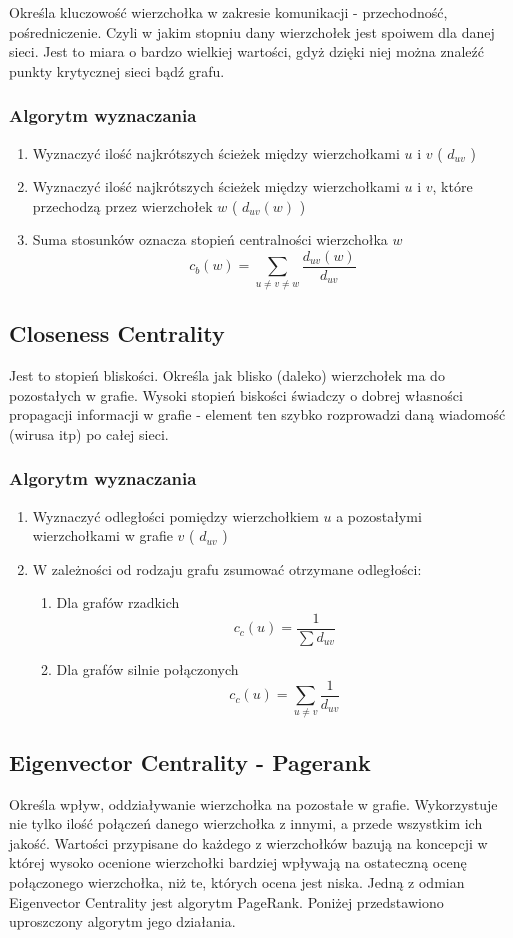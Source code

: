 Określa kluczowość wierzchołka w zakresie komunikacji - przechodność, pośredniczenie. Czyli w jakim stopniu dany wierzchołek jest spoiwem dla danej sieci. Jest to miara o bardzo wielkiej wartości, gdyż dzięki niej można znaleźć punkty krytycznej sieci bądź grafu.

\subsubsection{Algorytm wyznaczania}
\begin{enumerate}
\item Wyznaczyć ilość najkrótszych ścieżek między wierzchołkami $u$ i $v$ ( $d_{uv}$ )
\item Wyznaczyć ilość najkrótszych ścieżek między wierzchołkami $u$ i $v$, które przechodzą przez wierzchołek $w$ ( $d_{uv}(w)$ )
\item Suma stosunków  oznacza stopień centralności wierzchołka $w$ $$c_b(w) = \sum_{u \neq v \neq w} \frac{d_{uv}(w)}{d_{uv}}$$
\end{enumerate}

\subsection{Closeness Centrality}

Jest to stopień bliskości. Określa jak blisko (daleko) wierzchołek ma do pozostałych w grafie. Wysoki stopień biskości świadczy o dobrej własności propagacji informacji w grafie - element ten szybko rozprowadzi daną wiadomość (wirusa itp) po całej sieci.


\subsubsection{Algorytm wyznaczania}
\begin{enumerate}
\item Wyznaczyć odległości pomiędzy wierzchołkiem $u$ a pozostałymi wierzchołkami w grafie $v$  ( $d_{uv}$ )
\item W zależności od rodzaju grafu zsumować otrzymane odległości:
\begin{enumerate}
\item Dla grafów rzadkich $$ c_c(u) = \frac{1}{\sum d_{uv} }$$
\item Dla grafów silnie połączonych $$ c_c(u) = \sum_{u \neq v} \frac{1}{d_{uv} }$$
\end{enumerate}
\end{enumerate}
\newpage
\subsection{Eigenvector Centrality - Pagerank}
Określa wpływ, oddziaływanie wierzchołka na pozostałe w grafie. Wykorzystuje nie tylko ilość połączeń danego wierzchołka z innymi, a przede wszystkim ich jakość. Wartości przypisane do każdego z wierzchołków bazują na koncepcji w której wysoko ocenione wierzchołki bardziej wpływają na ostateczną ocenę połączonego wierzchołka, niż te, których ocena jest niska. Jedną z odmian Eigenvector Centrality jest algorytm PageRank. Poniżej przedstawiono uproszczony algorytm jego działania.

